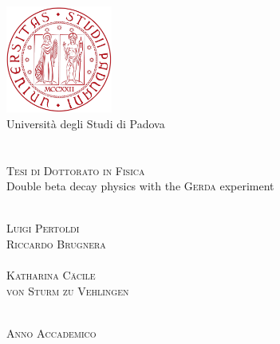 
\begin{titlepage}
  \thispagestyle{empty}
  \begin{center}
  \includegraphics[width=3.5cm]{img/unipd-logo.pdf} \\
  \vspace{0.5cm}
  {\Large Universit\`a degli Studi di Padova} \\
  \hrulefill \\
   \\
  \vspace{2cm}
  \textsc{\large Tesi di Dottorato in Fisica} \\
  \vspace{3cm}
  \huge{Double beta decay physics with the \textsc{Gerda} experiment}
  \end{center}
  \vspace{3cm}
  \begin{multicols}{2}
  \large
  \noindent
   \\
  \textsc{Luigi Pertoldi}
  \columnbreak
  \flushright
   \\
  \textsc{Riccardo Brugnera} \\
  \vspace{5mm}
   \\
  \textsc{Katharina Cäcile\\von Sturm zu Vehlingen}
  \end{multicols}
  \vspace*{\fill}
  \begin{center}
  \hrulefill \\
  \textsc{Anno Accademico }
  \end{center}
\end{titlepage}
\restoregeometry
